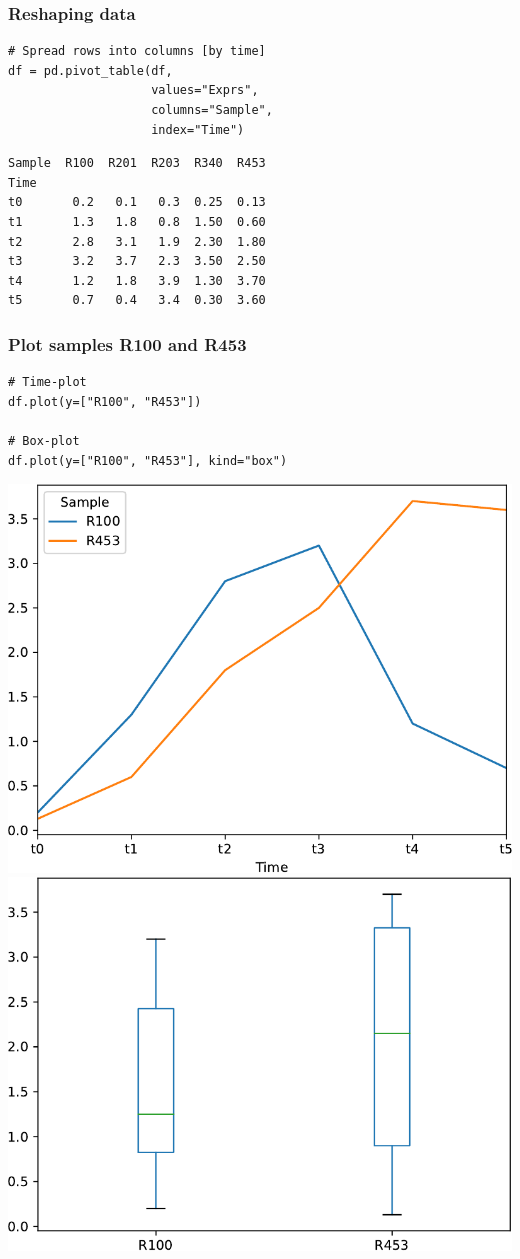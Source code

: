 \documentclass[pdf]{beamer}
\begin{document}
\begin{frame}[fragile]
\frametitle{Reshaping data}

\begin{lstlisting}[style=python]
# Spread rows into columns [by time]
df = pd.pivot_table(df,
                    values="Exprs", 
                    columns="Sample", 
                    index="Time")
\end{lstlisting}

\begin{verbatim}
Sample  R100  R201  R203  R340  R453
Time                                
t0       0.2   0.1   0.3  0.25  0.13
t1       1.3   1.8   0.8  1.50  0.60
t2       2.8   3.1   1.9  2.30  1.80
t3       3.2   3.7   2.3  3.50  2.50
t4       1.2   1.8   3.9  1.30  3.70
t5       0.7   0.4   3.4  0.30  3.60
\end{verbatim}

\end{frame}

\begin{frame}[fragile]
\frametitle{Plot samples R100 and R453}

\begin{lstlisting}[style=python]
# Time-plot
df.plot(y=["R100", "R453"])

# Box-plot
df.plot(y=["R100", "R453"], kind="box")
\end{lstlisting}

\begin{center}
	\includegraphics[width=.48\textwidth]{gene_exprs1.pdf}\hfill
	\includegraphics[width=.48\textwidth]{gene_exprs2.pdf}
\end{center}

\end{frame}
\end{document}
